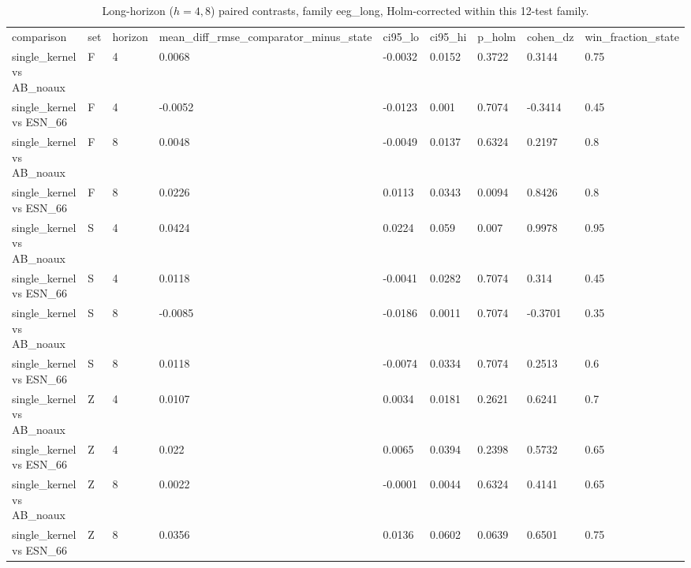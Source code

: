 \begin{table}
\caption{Long-horizon ($h=4,8$) paired contrasts, family eeg\_long, Holm-corrected within this 12-test family.}
\label{tab:long_horizon_contrasts}
\begin{ruledtabular}
\begin{tabular}{lllllllll}
comparison & set & horizon & mean_diff_rmse_comparator_minus_state & ci95_lo & ci95_hi & p_holm & cohen_dz & win_fraction_state \\
single_kernel vs AB_noaux & F & 4 & 0.0068 & -0.0032 & 0.0152 & 0.3722 & 0.3144 & 0.75 \\
single_kernel vs ESN_66 & F & 4 & -0.0052 & -0.0123 & 0.001 & 0.7074 & -0.3414 & 0.45 \\
single_kernel vs AB_noaux & F & 8 & 0.0048 & -0.0049 & 0.0137 & 0.6324 & 0.2197 & 0.8 \\
single_kernel vs ESN_66 & F & 8 & 0.0226 & 0.0113 & 0.0343 & 0.0094 & 0.8426 & 0.8 \\
single_kernel vs AB_noaux & S & 4 & 0.0424 & 0.0224 & 0.059 & 0.007 & 0.9978 & 0.95 \\
single_kernel vs ESN_66 & S & 4 & 0.0118 & -0.0041 & 0.0282 & 0.7074 & 0.314 & 0.45 \\
single_kernel vs AB_noaux & S & 8 & -0.0085 & -0.0186 & 0.0011 & 0.7074 & -0.3701 & 0.35 \\
single_kernel vs ESN_66 & S & 8 & 0.0118 & -0.0074 & 0.0334 & 0.7074 & 0.2513 & 0.6 \\
single_kernel vs AB_noaux & Z & 4 & 0.0107 & 0.0034 & 0.0181 & 0.2621 & 0.6241 & 0.7 \\
single_kernel vs ESN_66 & Z & 4 & 0.022 & 0.0065 & 0.0394 & 0.2398 & 0.5732 & 0.65 \\
single_kernel vs AB_noaux & Z & 8 & 0.0022 & -0.0001 & 0.0044 & 0.6324 & 0.4141 & 0.65 \\
single_kernel vs ESN_66 & Z & 8 & 0.0356 & 0.0136 & 0.0602 & 0.0639 & 0.6501 & 0.75 \\
\end{tabular}
\end{ruledtabular}
\end{table}